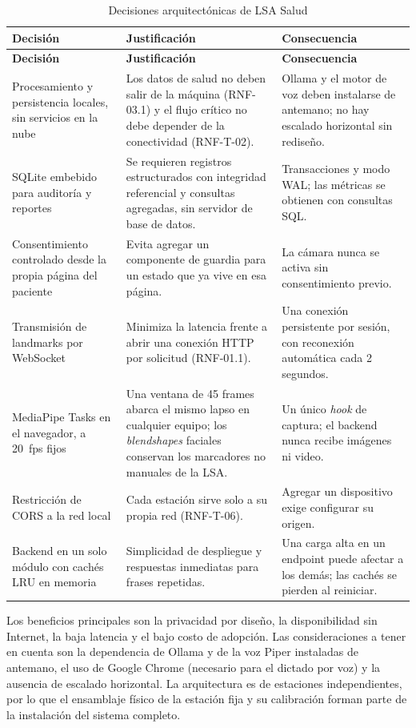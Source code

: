 \begin{longtable}{>{\raggedright\arraybackslash}p{3.9cm} >{\raggedright\arraybackslash}p{5.4cm} >{\raggedright\arraybackslash}p{5.3cm}}
  \caption{Decisiones arquitectónicas de LSA Salud}\label{tab:decisiones}\\
  \toprule
  \textbf{Decisión} & \textbf{Justificación} & \textbf{Consecuencia} \\
  \midrule
  \endfirsthead
  \toprule
  \textbf{Decisión} & \textbf{Justificación} & \textbf{Consecuencia} \\
  \midrule
  \endhead
  Procesamiento y persistencia locales, sin servicios en la nube & Los datos de salud no deben salir de la máquina (RNF-03.1) y el flujo crítico no debe depender de la conectividad (RNF-T-02). & Ollama y el motor de voz deben instalarse de antemano; no hay escalado horizontal sin rediseño. \\
  SQLite embebido para auditoría y reportes & Se requieren registros estructurados con integridad referencial y consultas agregadas, sin servidor de base de datos. & Transacciones y modo WAL; las métricas se obtienen con consultas SQL. \\
  Consentimiento controlado desde la propia página del paciente & Evita agregar un componente de guardia para un estado que ya vive en esa página. & La cámara nunca se activa sin consentimiento previo. \\
  Transmisión de landmarks por WebSocket & Minimiza la latencia frente a abrir una conexión HTTP por solicitud (RNF-01.1). & Una conexión persistente por sesión, con reconexión automática cada 2 segundos. \\
  MediaPipe Tasks en el navegador, a 20~fps fijos & Una ventana de 45 frames abarca el mismo lapso en cualquier equipo; los \emph{blendshapes} faciales conservan los marcadores no manuales de la LSA. & Un único \emph{hook} de captura; el backend nunca recibe imágenes ni video. \\
  Restricción de CORS a la red local & Cada estación sirve solo a su propia red (RNF-T-06). & Agregar un dispositivo exige configurar su origen. \\
  Backend en un solo módulo con cachés LRU en memoria & Simplicidad de despliegue y respuestas inmediatas para frases repetidas. & Una carga alta en un endpoint puede afectar a los demás; las cachés se pierden al reiniciar. \\
  \bottomrule
\end{longtable}

Los beneficios principales son la privacidad por diseño, la disponibilidad sin Internet, la baja latencia y el bajo costo de adopción. Las consideraciones a tener en cuenta son la dependencia de Ollama y de la voz Piper instaladas de antemano, el uso de Google Chrome (necesario para el dictado por voz) y la ausencia de escalado horizontal. La arquitectura es de estaciones independientes, por lo que el ensamblaje físico de la estación fija y su calibración forman parte de la instalación del sistema completo.

